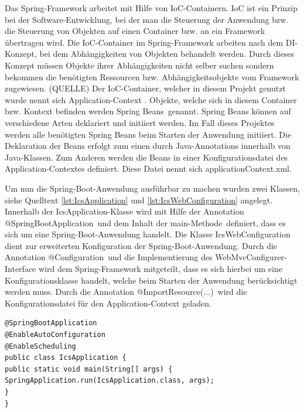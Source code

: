Das Spring-Framework arbeitet mit Hilfe von \ac{IoC}-Containern. \ac{IoC} ist ein Prinzip bei der Software-Entwicklung, bei der man die Steuerung der Anwendung bzw. die Steuerung von Objekten auf einen Container bzw. an ein Framework übertragen wird. Die \ac{IoC}-Container im Spring-Framework arbeiten nach dem \ac{DI}-Konzept, bei dem Abhängigkeiten von Objekten behandelt werden. Durch dieses Konzept müssen Objekte ihrer Abhängigkeiten nicht selber suchen sondern bekommen die benötigten Ressourcen bzw. Abhängigkeitsobjekte vom Framework zugewiesen. (QUELLE) Der \ac{IoC}-Container, welcher in diesem Projekt genutzt wurde nennt sich \glqq Application-Context \grqq. Objekte, welche sich in diesem Container bzw. Kontext befinden werden \glqq Spring Beans\grqq \, genannt. Spring Beans können auf verschiedene Arten deklariert und initiiert werden. Im Fall dieses Projektes werden alle benötigten Spring Beans beim Starten der Anwendung initiiert. Die Deklaration der Beans erfolgt zum einen durch Java-Annotations innerhalb von Java-Klassen. Zum Anderen werden die Beans in einer Konfigurationsdatei des Application-Contextes definiert. Diese Datei nennt sich \glqq applicationContext.xml\grqq.

Um nun die Spring-Boot-Anwendung ausführbar zu machen wurden zwei Klassen, siehe Quelltext \ref{lst:IcsApplication} und \ref{lst:IcsWebConfiguration} angelegt. Innerhalb der \glqq IcsApplication\grqq -Klasse wird mit Hilfe der Annotation \glqq @SpringBootApplication\grqq \, und dem Inhalt der \glqq main-Methode\grqq \, definiert, dass es sich um eine Spring-Boot-Anwendung handelt. Die Klasse \glqq IcsWebConfiguration\grqq \, dient zur erweiterten Konfiguration der Spring-Boot-Anwendung. Durch die Annotation \glqq @Configuration\grqq \, und die Implementierung des \glqq WebMvcConfigurer\grqq -Interface wird dem Spring-Framework mitgeteilt, dass es sich hierbei um eine Konfigurationsklasse handelt, welche beim Starten der Anwendung berücksichtigt werden muss. Durch die Annotation \glqq @ImportResource(...)\grqq \, wird die Konfigurationsdatei für den Application-Context geladen.

\lstset{language=Java}
\begin{lstlisting}[caption={IcsApplication.java}, label={lst:IcsApplication}]
@SpringBootApplication
@EnableAutoConfiguration
@EnableScheduling
public class IcsApplication {
public static void main(String[] args) {
SpringApplication.run(IcsApplication.class, args);
}
}
\end{lstlisting}

